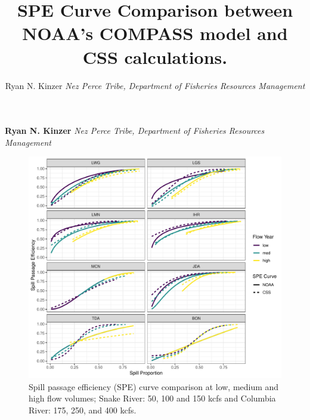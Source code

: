 \documentclass[]{article}
\title{SPE Curve Comparison between NOAA's COMPASS model and CSS calculations.  }
\author{\Large Ryan N. Kinzer\vspace{0.05in} \newline\normalsize\emph{Nez Perce Tribe, Department of Fisheries Resources Management}  }
\date{}
\makeatletter
\newcommand*{\authorfont}{\fontfamily{phv}\selectfont}
\def\maxwidth{\ifdim\Gin@nat@width>\linewidth\linewidth
  \else\Gin@nat@width\fi}
\let\Oldincludegraphics\includegraphics
\renewcommand{\includegraphics}[1]{\Oldincludegraphics[width=\maxwidth]{#1}}
\makeatother
\begin{document}
  
  {%
  \setlength{\parindent}{0pt}
  {\fontsize{18}{20}\selectfont\raggedright 
  \maketitle  %
  \thispagestyle{empty}
  }
  
  
  {
  \vskip 13.5pt\relax \normalsize\fontsize{11}{12} 
  \textbf{\authorfont Ryan N. Kinzer} \hskip 15pt \emph{\small Nez Perce Tribe, Department of Fisheries Resources Management}   
  
    \hbox{\vrule height .2pt width 39.14pc}
  
  }
  
  }
  
  
    
    
    
  \vskip 6.5pt
  
  \noindent  \begin{figure}
\centering
\includegraphics{spe_comparisons_files/figure-latex/unnamed-chunk-4-1.pdf}
\caption{Spill passage efficiency (SPE) curve comparison at low, medium
and high flow volumes; Snake River: 50, 100 and 150 kcfs and Columbia
River: 175, 250, and 400 kcfs.}
\end{figure}
\end{document}
